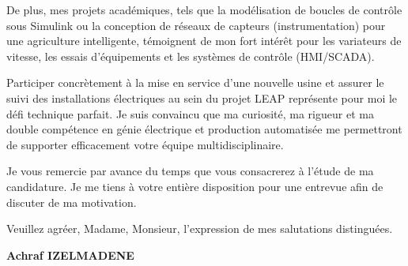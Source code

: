 \documentclass[11pt,a4paper]{article}
\begin{document}
De plus, mes projets académiques, tels que la modélisation de boucles de contrôle sous Simulink ou la conception de réseaux de capteurs (instrumentation) pour une agriculture intelligente, témoignent de mon fort intérêt pour les variateurs de vitesse, les essais d'équipements et les systèmes de contrôle (HMI/SCADA).

Participer concrètement à la mise en service d'une nouvelle usine et assurer le suivi des installations électriques au sein du projet LEAP représente pour moi le défi technique parfait. Je suis convaincu que ma curiosité, ma rigueur et ma double compétence en génie électrique et production automatisée me permettront de supporter efficacement votre équipe multidisciplinaire.

Je vous remercie par avance du temps que vous consacrerez à l'étude de ma candidature. Je me tiens à votre entière disposition pour une entrevue afin de discuter de ma motivation.

Veuillez agréer, Madame, Monsieur, l'expression de mes salutations distinguées.

\vspace{1cm}
\textbf{Achraf IZELMADENE}
\end{document}
